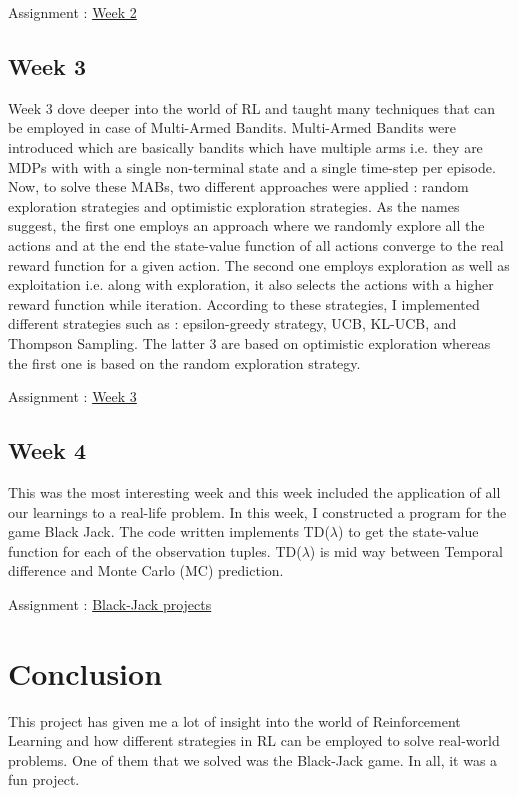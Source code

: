 \documentclass{article}
\begin{document}
Assignment : \href{https://github.com/dwijaap/WIDS-UID74/blob/main/Assignment2.ipynb}{Week 2}

\subsection{Week 3}

Week 3 dove deeper into the world of RL and taught many techniques that can be employed in case of Multi-Armed Bandits. Multi-Armed Bandits were introduced which are basically bandits which have multiple arms i.e. they are MDPs with with a single non-terminal state and a single time-step per episode. Now, to solve these MABs, two different approaches were applied : random exploration strategies and optimistic exploration strategies. As the names suggest, the first one employs an approach where we randomly explore all the actions and at the end the state-value function of all actions converge to the real reward function for a given action. The second one employs exploration as well as exploitation i.e. along with exploration, it also selects the actions with a higher reward function while iteration. According to these strategies, I implemented different strategies such as : epsilon-greedy strategy, UCB, KL-UCB, and Thompson Sampling. The latter 3 are based on optimistic exploration whereas the first one is based on the random exploration strategy.

Assignment : \href{https://github.com/dwijaap/WIDS-UID74/blob/main/Assignment3.ipynb}{Week 3}


\subsection{Week 4}

This was the most interesting week and this week included the application of all our learnings to a real-life problem. In this week, I constructed a program for the game Black Jack. The code written implements TD($\lambda$) to get the state-value function for each of the observation tuples. TD($\lambda$) is mid way between Temporal difference and Monte Carlo (MC) prediction. 

Assignment : \href{https://github.com/dwijaap/WIDS-UID74/blob/main/Black-Jack%20Project.ipynb}{Black-Jack projects}

\section{Conclusion}

This project has given me a lot of insight into the world of Reinforcement Learning and how different strategies in RL can be employed to solve real-world problems. One of them that we solved was the Black-Jack game. In all, it was a fun project.
\end{document}
